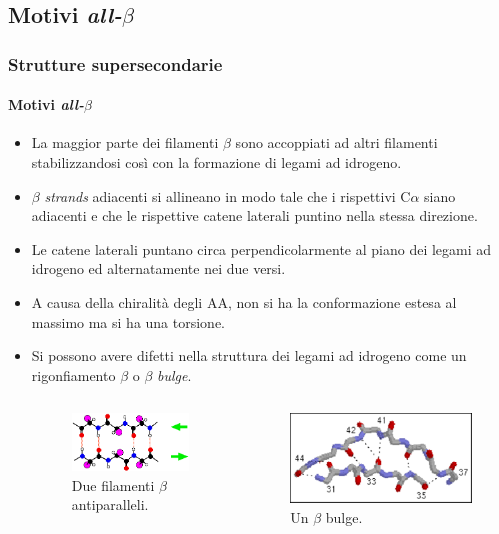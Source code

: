 \documentclass{beamer}
\begin{document}
\subsection{Motivi \itshape{all-$\beta$}}
\begin{frame} \frametitle{Strutture supersecondarie}
  \framesubtitle{Motivi \itshape{all-$\beta$}}
\begin{itemize}
 \item La maggior parte dei filamenti $\beta$ sono accoppiati ad altri filamenti stabilizzandosi così con la formazione di legami ad idrogeno.
 \pause  \item $\beta$ \emph{strands} adiacenti si allineano in modo tale che i rispettivi C$\alpha$ siano adiacenti e che le rispettive catene laterali puntino nella stessa direzione.
\pause \item Le catene laterali puntano circa perpendicolarmente al piano dei legami ad idrogeno ed alternatamente nei due versi.
\pause  \item A causa della chiralità degli AA, non si ha la conformazione estesa al massimo ma si ha una torsione.\end{itemize}\end{frame}\begin{frame}
\begin{itemize} \item Si possono avere difetti nella struttura dei legami ad idrogeno come un rigonfiamento $\beta$ o $\beta$ \emph{bulge}.
\begin{columns}
      
      \begin{figure}\includegraphics[scale=0.3]{bhairpin.png}\caption{Due filamenti $\beta$ antiparalleli.}\end{figure}
\begin{figure}\includegraphics[scale=0.5]{bbulge.pdf}\caption{Un $\beta$ bulge.}\end{figure}
\end{columns}


\end{itemize}
\end{frame}
\end{document}
